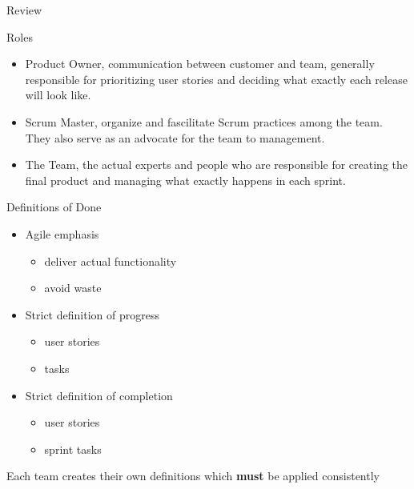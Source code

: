 \documentclass{report}
\begin{document}
\begin{description}
    \item Review

        Roles
        \begin{itemize}
            \item Product Owner, communication between
                customer and team, generally responsible
                for prioritizing user stories and deciding
                what exactly each release will look like.
            \item Scrum Master, organize and fascilitate
                Scrum practices among the team. They also
                serve as an advocate for the team to management.
            \item The Team, the actual experts and people
                who are responsible for creating the final
                product and managing what exactly happens
                in each sprint.
        \end{itemize}
    \item Definitions of Done
        \begin{itemize}
            \item Agile emphasis
                \begin{itemize}
                    \item deliver actual functionality
                    \item avoid waste
                \end{itemize}
            \item Strict definition of progress
                \begin{itemize}
                    \item  user stories
                    \item tasks
                \end{itemize}
            \item Strict definition of completion
                \begin{itemize}
                    \item user stories
                    \item sprint tasks
                \end{itemize}
        \end{itemize}

        Each team creates their own definitions
        which \textbf{must} be applied consistently


\end{description}
\end{document}
